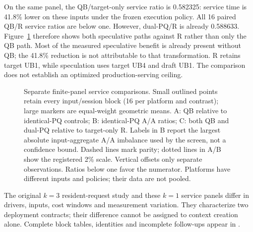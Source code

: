 On the same panel, the QB/target-only service ratio is 0.582325: service time is 41.8\% lower on these inputs under the frozen execution policy. All 16 paired QB/R service ratios are below one. However, dual-PQ/R is already 0.588633. Figure~\ref{fig:servicepanels} therefore shows both speculative paths against R rather than only the QB path. Most of the measured speculative benefit is already present without QB; the 41.8\% reduction is not attributable to that transformation. R retains target UB1, while speculation uses target UB4 and draft UB1. The comparison does not establish an optimized production-serving ceiling.

\begin{figure}[t]
\centering
\caption{Separate finite-panel service comparisons. Small outlined points retain every input/session block (16 per platform and contrast); large markers are equal-weight geometric means. A: QB relative to identical-PQ controls; B: identical-PQ A/A ratios; C: both QB and dual-PQ relative to target-only R. Labels in B report the largest absolute input-aggregate A/A imbalance used by the screen, not a confidence bound. Dashed lines mark parity; dotted lines in A/B show the registered 2\% scale. Vertical offsets only separate observations. Ratios below one favor the numerator. Platforms have different inputs and policies; their data are not pooled.}
\label{fig:servicepanels}
\end{figure}

The original $k=3$ resident-request study and these $k=1$ service panels differ in drivers, inputs, cost windows and measurement variation. They characterize two deployment contracts; their difference cannot be assigned to context creation alone. Complete block tables, identities and incomplete follow-ups appear in .
